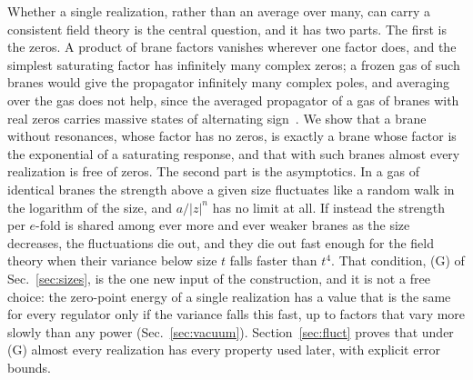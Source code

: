\documentclass[a4paper,11pt]{article}
\begin{document}
Whether a single realization, rather than an average over many, can carry a consistent field theory is the central question, and it has two parts. The first is the zeros. A product of brane factors vanishes wherever one factor does, and the simplest saturating factor has infinitely many complex zeros; a frozen gas of such branes would give the propagator infinitely many complex poles, and averaging over the gas does not help, since the averaged propagator of a gas of branes with real zeros carries massive states of alternating sign~\cite{BhattacharjeeBhattacharya2026}. We show that a brane without resonances, whose factor has no zeros, is exactly a brane whose factor is the exponential of a saturating response, and that with such branes almost every realization is free of zeros. The second part is the asymptotics. In a gas of identical branes the strength above a given size fluctuates like a random walk in the logarithm of the size, and $a/|z|^{n}$ has no limit at all. If instead the strength per $e$-fold is shared among ever more and ever weaker branes as the size decreases, the fluctuations die out, and they die out fast enough for the field theory when their variance below size $t$ falls faster than $t^{4}$. That condition, (G) of Sec.~\ref{sec:sizes}, is the one new input of the construction, and it is not a free choice: the zero-point energy of a single realization has a value that is the same for every regulator only if the variance falls this fast, up to factors that vary more slowly than any power (Sec.~\ref{sec:vacuum}). Section~\ref{sec:fluct} proves that under (G) almost every realization has every property used later, with explicit error bounds.
\end{document}
